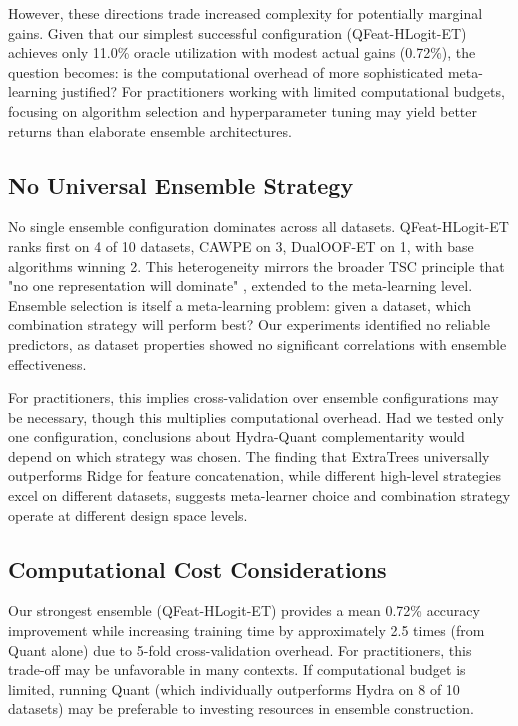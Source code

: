 \documentclass[pdflatex,sn-basic]{sn-jnl}           %
\theoremstyle{thmstyleone}%
\theoremstyle{thmstyletwo}%
\theoremstyle{thmstylethree}%
\begin{document}
However, these directions trade increased complexity for potentially marginal gains. Given that our simplest successful configuration (QFeat-HLogit-ET) achieves only 11.0\% oracle utilization with modest actual gains (0.72\%), the question becomes: is the computational overhead of more sophisticated meta-learning justified? For practitioners working with limited computational budgets, focusing on algorithm selection and hyperparameter tuning may yield better returns than elaborate ensemble architectures.

\subsection{No Universal Ensemble Strategy}

No single ensemble configuration dominates across all datasets. QFeat-HLogit-ET ranks first on 4 of 10 datasets, CAWPE on 3, DualOOF-ET on 1, with base algorithms winning 2. This heterogeneity mirrors the broader TSC principle that "no one representation will dominate" \citep{tsc-bakeoff}, extended to the meta-learning level. Ensemble selection is itself a meta-learning problem: given a dataset, which combination strategy will perform best? Our experiments identified no reliable predictors, as dataset properties showed no significant correlations with ensemble effectiveness.

For practitioners, this implies cross-validation over ensemble configurations may be necessary, though this multiplies computational overhead. Had we tested only one configuration, conclusions about Hydra-Quant complementarity would depend on which strategy was chosen. The finding that ExtraTrees universally outperforms Ridge for feature concatenation, while different high-level strategies excel on different datasets, suggests meta-learner choice and combination strategy operate at different design space levels.

\subsection{Computational Cost Considerations}

Our strongest ensemble (QFeat-HLogit-ET) provides a mean 0.72\% accuracy improvement while increasing training time by approximately 2.5 times (from Quant alone) due to 5-fold cross-validation overhead. For practitioners, this trade-off may be unfavorable in many contexts. If computational budget is limited, running Quant (which individually outperforms Hydra on 8 of 10 datasets) may be preferable to investing resources in ensemble construction.
\end{document}
